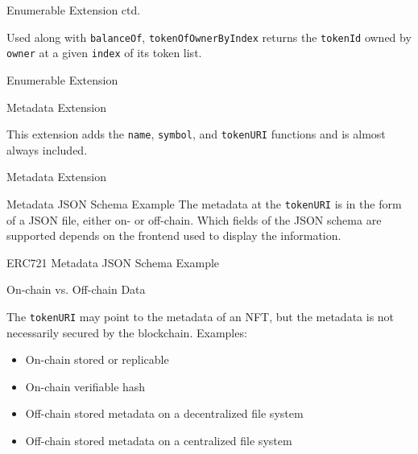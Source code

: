 \documentclass[]{beamer}
\begin{document}
\begin{frame}{Enumerable Extension ctd.}

Used along with \texttt{balanceOf}, \texttt{tokenOfOwnerByIndex} returns the \texttt{tokenId} owned by \texttt{owner} at a given \texttt{index} of its token list.
\vspace{0.5em}
	\begin{samplecode}{Enumerable Extension}
		
	\end{samplecode}
\end{frame}

\begin{frame}{Metadata Extension}

This extension adds the \texttt{name}, \texttt{symbol}, and \texttt{tokenURI} functions and is almost always included.
\vspace{0.5em}
	\begin{samplecode}{Metadata Extension}
		
	\end{samplecode}
\end{frame}

\begin{frame}{Metadata JSON Schema Example}
The metadata at the \texttt{tokenURI} is in the form of a JSON file, either on- or off-chain. Which fields of the JSON schema are supported depends on the frontend used to display the information.
\vspace{0.5em}
\begin{samplecode}{ERC721 Metadata JSON Schema Example}
	
\end{samplecode}
\end{frame}

\begin{frame}{On-chain vs. Off-chain Data}

The \texttt{tokenURI} may point to the metadata of an NFT, but the metadata is not necessarily secured by the blockchain. Examples:\\
	\begin{itemize}
		\item<2-> On-chain stored or replicable
		\item<3-> On-chain verifiable hash
		\item<4-> Off-chain stored metadata on a decentralized file system
		\item<5-> Off-chain stored metadata on a centralized file system
	\end{itemize}
\end{frame}
\end{document}
